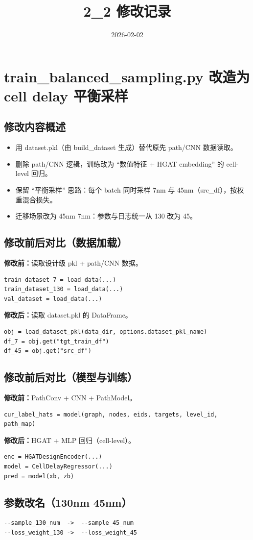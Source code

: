 \documentclass{ctexart}
\title{2\_2 修改记录}
\date{2026-02-02}
\begin{document}
\maketitle

\section{train\_balanced\_sampling.py 改造为 cell delay 平衡采样}
\subsection{修改内容概述}
\begin{itemize}
  \item 用 dataset.pkl（由 build\_dataset 生成）替代原先 path/CNN 数据读取。
  \item 删除 path/CNN 逻辑，训练改为 ``数值特征 + HGAT embedding'' 的 cell-level 回归。
  \item 保留 ``平衡采样'' 思路：每个 batch 同时采样 7nm 与 45nm（src\_df），按权重混合损失。
  \item 迁移场景改为 45nm \rightarrow 7nm：参数与日志统一从 130 改为 45。
\end{itemize}

\subsection{修改前后对比（数据加载）}
\textbf{修改前：}读取设计级 pkl + path/CNN 数据。
\begin{lstlisting}
train_dataset_7 = load_data(...)
train_dataset_130 = load_data(...)
val_dataset = load_data(...)
\end{lstlisting}

\textbf{修改后：}读取 dataset.pkl 的 DataFrame。
\begin{lstlisting}
obj = load_dataset_pkl(data_dir, options.dataset_pkl_name)
df_7 = obj.get("tgt_train_df")
df_45 = obj.get("src_df")
\end{lstlisting}

\subsection{修改前后对比（模型与训练）}
\textbf{修改前：}PathConv + CNN + PathModel。
\begin{lstlisting}
cur_label_hats = model(graph, nodes, eids, targets, level_id, path_map)
\end{lstlisting}

\textbf{修改后：}HGAT + MLP 回归（cell-level）。
\begin{lstlisting}
enc = HGATDesignEncoder(...)
model = CellDelayRegressor(...)
pred = model(xb, zb)
\end{lstlisting}

\subsection{参数改名（130nm \rightarrow 45nm）}
\begin{lstlisting}
--sample_130_num  ->  --sample_45_num
--loss_weight_130 ->  --loss_weight_45
\end{lstlisting}
\end{document}
